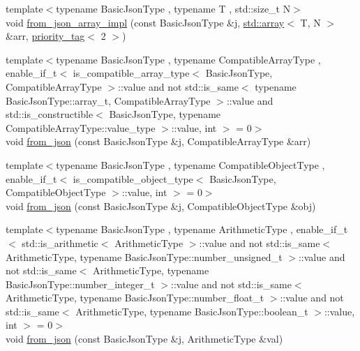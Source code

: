 \begin{DoxyCompactItemize}
\item 
{\footnotesize template$<$typename Basic\+Json\+Type , typename T , std\+::size\+\_\+t N$>$ }\\void \hyperlink{namespacenlohmann_1_1detail_a46b0781205d0bdc5a959343b389966a4}{from\+\_\+json\+\_\+array\+\_\+impl} (const Basic\+Json\+Type \&j, \hyperlink{namespacenlohmann_1_1detail_a1ed8fc6239da25abcaf681d30ace4985af1f713c9e000f5d3f280adbd124df4f5}{std\+::array}$<$ T, N $>$ \&arr, \hyperlink{structnlohmann_1_1detail_1_1priority__tag}{priority\+\_\+tag}$<$ 2 $>$)
\item 
{\footnotesize template$<$typename Basic\+Json\+Type , typename Compatible\+Array\+Type , enable\+\_\+if\+\_\+t$<$ is\+\_\+compatible\+\_\+array\+\_\+type$<$ Basic\+Json\+Type, Compatible\+Array\+Type $>$\+::value and not std\+::is\+\_\+same$<$ typename Basic\+Json\+Type\+::array\+\_\+t, Compatible\+Array\+Type $>$\+::value and std\+::is\+\_\+constructible$<$ Basic\+Json\+Type, typename Compatible\+Array\+Type\+::value\+\_\+type $>$\+::value, int $>$  = 0$>$ }\\void \hyperlink{namespacenlohmann_1_1detail_a8dcac00852dbe1f61d1e78135b19d428}{from\+\_\+json} (const Basic\+Json\+Type \&j, Compatible\+Array\+Type \&arr)
\item 
{\footnotesize template$<$typename Basic\+Json\+Type , typename Compatible\+Object\+Type , enable\+\_\+if\+\_\+t$<$ is\+\_\+compatible\+\_\+object\+\_\+type$<$ Basic\+Json\+Type, Compatible\+Object\+Type $>$\+::value, int $>$  = 0$>$ }\\void \hyperlink{namespacenlohmann_1_1detail_a5e7a3674e8ac46f8feebad9712d7c55f}{from\+\_\+json} (const Basic\+Json\+Type \&j, Compatible\+Object\+Type \&obj)
\item 
{\footnotesize template$<$typename Basic\+Json\+Type , typename Arithmetic\+Type , enable\+\_\+if\+\_\+t$<$ std\+::is\+\_\+arithmetic$<$ Arithmetic\+Type $>$\+::value and not std\+::is\+\_\+same$<$ Arithmetic\+Type, typename Basic\+Json\+Type\+::number\+\_\+unsigned\+\_\+t $>$\+::value and not std\+::is\+\_\+same$<$ Arithmetic\+Type, typename Basic\+Json\+Type\+::number\+\_\+integer\+\_\+t $>$\+::value and not std\+::is\+\_\+same$<$ Arithmetic\+Type, typename Basic\+Json\+Type\+::number\+\_\+float\+\_\+t $>$\+::value and not std\+::is\+\_\+same$<$ Arithmetic\+Type, typename Basic\+Json\+Type\+::boolean\+\_\+t $>$\+::value, int $>$  = 0$>$ }\\void \hyperlink{namespacenlohmann_1_1detail_a839b0ab50d2c9bce669068f56bc41202}{from\+\_\+json} (const Basic\+Json\+Type \&j, Arithmetic\+Type \&val)

\end{DoxyCompactItemize}
